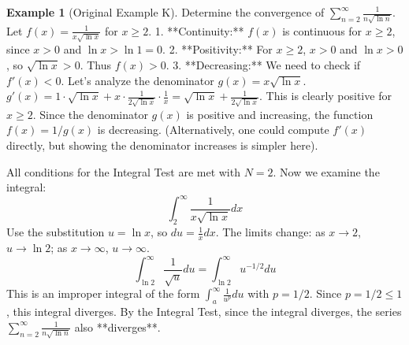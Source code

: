 \documentclass[11pt]{article}
\theoremstyle{plain}
\theoremstyle{definition}
\newtheorem{example}[theorem]{Example}
\theoremstyle{remark}
\theoremstyle{adminstyle}
\begin{document}
\begin{example}[Original Example K] \label{ex:integral_test_n_lnn_sqrt}
Determine the convergence of $\sum_{n=2}^{\infty} \frac{1}{n \sqrt{\ln n}}$.
Let $f(x) = \frac{1}{x \sqrt{\ln x}}$ for $x \ge 2$.
1.  **Continuity:** $f(x)$ is continuous for $x \ge 2$, since $x > 0$ and $\ln x > \ln 1 = 0$.
2.  **Positivity:** For $x \ge 2$, $x > 0$ and $\ln x > 0$, so $\sqrt{\ln x} > 0$. Thus $f(x) > 0$.
3.  **Decreasing:** We need to check if $f'(x) < 0$. Let's analyze the denominator $g(x) = x \sqrt{\ln x}$. $g'(x) = 1 \cdot \sqrt{\ln x} + x \cdot \frac{1}{2\sqrt{\ln x}} \cdot \frac{1}{x} = \sqrt{\ln x} + \frac{1}{2\sqrt{\ln x}}$. This is clearly positive for $x \ge 2$. Since the denominator $g(x)$ is positive and increasing, the function $f(x) = 1/g(x)$ is decreasing. (Alternatively, one could compute $f'(x)$ directly, but showing the denominator increases is simpler here).

All conditions for the Integral Test are met with $N=2$. Now we examine the integral:
\[ \int_2^\infty \frac{1}{x \sqrt{\ln x}} dx \]
Use the substitution $u = \ln x$, so $du = \frac{1}{x} dx$. The limits change: as $x \to 2$, $u \to \ln 2$; as $x \to \infty$, $u \to \infty$.
\[ \int_{\ln 2}^\infty \frac{1}{\sqrt{u}} du = \int_{\ln 2}^\infty u^{-1/2} du \]
This is an improper integral of the form $\int_a^\infty \frac{1}{u^p} du$ with $p = 1/2$. Since $p = 1/2 \le 1$, this integral diverges.
By the Integral Test, since the integral diverges, the series $\sum_{n=2}^{\infty} \frac{1}{n \sqrt{\ln n}}$ also **diverges**.
\end{example}
\end{document}
